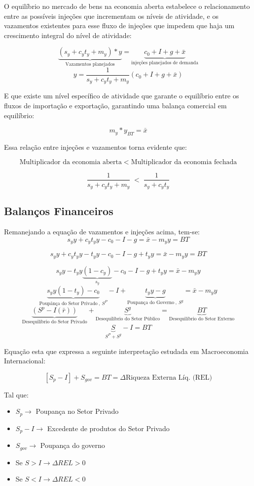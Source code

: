 \documentclass[a4paper,12pt]{article}[abntex2]
\begin{document}
O equilíbrio no mercado de bens na economia aberta estabelece o relacionamento entre as possíveis injeções que incrementam os níveis de atividade, e os vazamentos existentes para esse fluxo de injeções que impedem que haja um crescimento integral do nível de atividade:

\[
\underbrace{(s_y + c_y t_y + m_y) \ast y}_\text{Vazamentos planejados} = \underbrace{c_0 + I + g + \bar{x}}_\text{injeções planejados de demanda}
\]
\[
y=\frac{1}{s_y + c_y t_y + m_y}(c_0 + I + g + \bar{x})
\]

E que existe um nível específico de atividade que garante o equilíbrio entre os fluxos de importação e exportação, garantindo uma balança comercial em equilíbrio:

\[
m_y \ast y_{BT} = \bar{x}
\]

Essa relação entre injeções e vazamentos torna evidente que:

\[
\text{Multiplicador da economia aberta} \;<\; \text{Multiplicador da economia fechada}
\]

\[
\frac{1}{s_y + c_y t_y + m_y} \;<\; \frac{1}{s_y + c_y t_y}
\]


\subsection{\textbf{Balanços Financeiros}}

Remanejando a equação de vazamentos e injeções acima, tem-se:
\[
s_yy + c_y t_yy-c_0-I-g=\bar{x}-m_yy=BT
\]

\[
s_yy + c_y t_yy-t_yy-c_0-I-g+t_yy=\bar{x}-m_yy=BT
\]

\[
s_yy-t_yy\underbrace{(1-c_y)}_{s_y}-c_0-I-g+t_yy=\bar{x}-m_yy
\]
\[
\underbrace{s_yy(1-t_y)-c_0}_{\text{Poupânça do Setor Privado}\ , \ S^P}-I+\underbrace{t_yy-g}_{\text{Poupança do Governo}\ , \ S^g}=\bar{x}-m_yy
\]
\[
\underbrace{(S^p-I(\bar{r}))}_{\text{Desequilíbrio do Setor Privado}}+\underbrace{S^g}_{\text{Desequilíbrio do Setor Público}}=\underbrace{BT}_\text{Desequilíbrio do Setor Externo}
\]
\[
\underbrace{S}_{S^P+S^g}-I=BT
\]


Equação esta que expressa a seguinte interpretação estudada em Macroeconomia Internacional:

\[
[S_p - I] + S_{gov} = BT = \Delta \text{Riqueza Externa Líq. (REL)}
\]

Tal que:
\begin{itemize}
    \item $S_p \rightarrow$ Poupança no Setor Privado
    \item $S_p - I \rightarrow$ Excedente de produtos do Setor Privado
    \item $S_{gov} \rightarrow$ Poupança do governo
    \item Se \(S>I\rightarrow\Delta REL>0\)
    \item Se \(S<I\rightarrow\Delta REL<0\)
\end{itemize}
\end{document}
